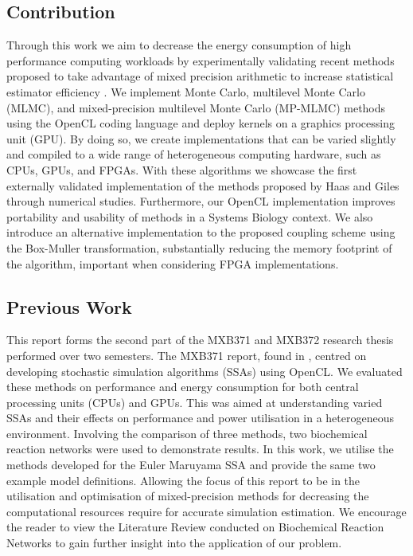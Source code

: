 \subsection{Contribution}
Through this work we aim to decrease the energy consumption of high performance computing workloads by experimentally validating recent methods proposed to take advantage of mixed precision arithmetic to increase statistical estimator efficiency \cite{haasNestedMLMCFramework2025, kimpsonReducedPrecisionStochasticSimulation2026, bruggerMixedPrecisionMultilevel2014}. We implement Monte Carlo, multilevel Monte Carlo (MLMC), and mixed-precision multilevel Monte Carlo (MP-MLMC) methods using the OpenCL coding language and deploy kernels on a graphics processing unit (GPU). By doing so, we create implementations that can be varied slightly and compiled to a wide range of heterogeneous computing hardware, such as CPUs, GPUs, and FPGAs. With these algorithms we showcase the first externally validated implementation of the methods proposed by Haas and Giles through numerical studies. Furthermore, our OpenCL implementation improves portability and usability of methods in a Systems Biology context. We also introduce an alternative implementation to the proposed coupling scheme using the Box-Muller transformation, substantially reducing the memory footprint of the algorithm, important when considering FPGA implementations.
 
\subsection{Previous Work}
This report forms the second part of the MXB371 and MXB372 research thesis performed over two semesters. The MXB371 report, found in , centred on developing stochastic simulation algorithms (SSAs) using OpenCL. We evaluated these methods on performance and energy consumption for both central processing units (CPUs) and GPUs. This was aimed at understanding varied SSAs and their effects on performance and power utilisation in a heterogeneous environment. Involving the comparison of three methods, two biochemical reaction networks were used to demonstrate results. In this work, we utilise the methods developed for the Euler Maruyama SSA and provide the same two example model definitions. Allowing the focus of this report to be in the utilisation and optimisation of mixed-precision methods for decreasing the computational resources require for accurate simulation estimation. We encourage the reader to view the Literature Review conducted on Biochemical Reaction Networks to gain further insight into the application of our problem. 